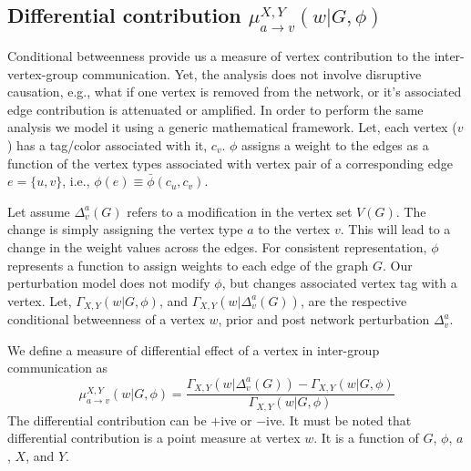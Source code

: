 \documentclass{article}
\begin{document}
\subsection{Differential contribution $\mu^{X,Y}_{a \rightarrow v}(w \vert G,\phi)$}
Conditional betweenness provide us a measure of vertex contribution to the inter-vertex-group communication. Yet, the analysis does not involve disruptive causation, e.g., what if one vertex is removed from the network, or it's associated edge contribution is attenuated or amplified. In order to perform the same analysis we model it using a generic mathematical framework. Let, each vertex ($v$) has a tag/color associated with it, $c_{v}$. $\phi$ assigns a weight to the edges as a function of the vertex types associated with vertex pair of a corresponding edge $e = \lbrace u, v \rbrace $, i.e., $\phi(e) \equiv \bar{\phi}(c_u, c_v)$.
\par
Let assume $\Delta^{a}_{v}(G)$ refers to a modification in the vertex set $V(G)$. The change is simply assigning the vertex type $a$ to the vertex $v$. This will lead to a change in the weight values across the edges. For consistent representation, $\phi$ represents a function to assign weights to each edge of the graph $G$. Our perturbation model does not modify $\phi$, but changes associated vertex tag with a vertex. Let, $\Gamma_{X,Y}(w\vert G, \phi)$, and $\Gamma_{X,Y}( w \vert \Delta^{a}_{v}(G))$, are the respective conditional betweenness of a vertex $w$, prior and post network perturbation $\Delta^{a}_{v}$.
\par
We define a measure of differential effect of a vertex in inter-group communication as 
\begin{equation*}
    \mu^{X,Y}_{a\rightarrow v}(w \vert G, \phi) = \dfrac{\Gamma_{X,Y}( w \vert \Delta^{a}_{v}(G)) - \Gamma_{X,Y}(w\vert G, \phi)}{ \Gamma_{X,Y}(w\vert G, \phi) }
\end{equation*}
The differential contribution can be $+$ive or $-$ive. It must be noted that differential contribution is a point measure at vertex $w$. It is a function of $G$, $\phi$, $a$, $X$, and $Y$. 
\end{document}
